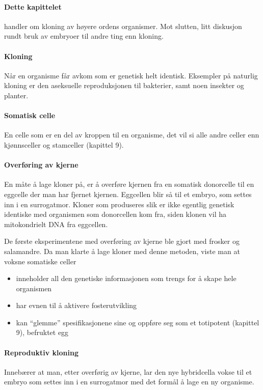 
\paragraph{Dette kapittelet} handler om kloning av høyere ordens organismer. Mot slutten, litt diskusjon rundt bruk av embryoer til andre ting enn kloning.

\paragraph{Kloning} Når en organisme får avkom som er genetisk helt identisk. Eksempler på naturlig kloning er den aseksuelle reproduksjonen til bakterier, samt noen insekter og planter.

\paragraph{Somatisk celle} En celle som er en del av kroppen til en organisme, det vil si alle andre celler enn kjønnsceller og stamceller (kapittel 9).

\paragraph{Overføring av kjerne} En måte å lage kloner på, er å overføre kjernen fra en somatisk donorcelle til en eggcelle der man har fjernet kjernen. Eggcellen blir så til et embryo, som settes inn i en surrogatmor. Kloner som produseres slik er ikke egentlig genetisk identiske med organismen som donorcellen kom fra, siden klonen vil ha mitokondrielt DNA fra eggcellen.

De første eksperimentene med overføring av kjerne ble gjort med frosker og salamandre. Da man klarte å lage kloner med denne metoden, viste man at voksne somatiske celler
\begin{itemize}[nolistsep,noitemsep]
	\item inneholder all den genetiske informasjonen som trengs for å skape hele organismen
	\item har evnen til å aktivere fosterutvikling
	\item kan ``glemme'' spesifikasjonene sine og oppføre seg som et totipotent (kapittel 9), befruktet egg
\end{itemize}

\paragraph{Reproduktiv kloning} Innebærer at man, etter overførig av kjerne, lar den nye hybridcella vokse til et embryo som settes inn i en surrogatmor med det formål å lage en ny organisme.

